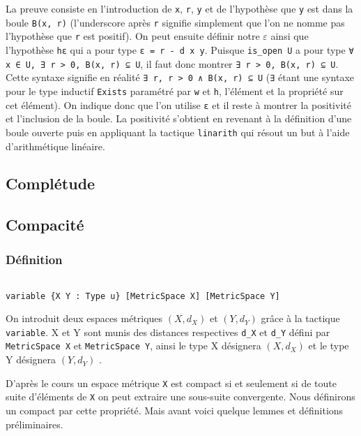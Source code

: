 \documentclass[a4paper, 12pt]{article}
\newcommand{\lean}[1]{\texttt{#1}}
\begin{document}
La preuve consiste en l'introduction de \lean{x}, \lean{r}, \lean{y} et de l'hypothèse que \lean{y} est dans la boule \lean{B(x, r)} (l'underscore après \lean{r} signifie simplement que l'on ne nomme pas l'hypothèse que \lean{r} est positif). On peut ensuite définir notre $ε$ ainsi que l'hypothèse \lean{hε} qui a pour type \lean{ε = r - d x y}. Puisque \lean{is_open U} a pour type \lean{∀ x ∈ U, ∃ r > 0, B(x, r) ⊆ U}, il faut donc montrer \lean{∃ r > 0, B(x, r) ⊆ U}. Cette syntaxe signifie en réalité \lean{∃ r, r > 0 ∧ B(x, r) ⊆ U} (\lean{∃} étant une syntaxe pour le type inductif \lean{Exists} paramétré par \lean{w} et \lean{h}, l'élément et la propriété sur cet élément). On indique donc que l'on utilise \lean{ε} et il reste à montrer la positivité et l'inclusion de la boule. La positivité s'obtient en revenant à la définition d'une boule ouverte puis en appliquant la tactique \lean{linarith} qui résout un but à l'aide d'arithmétique linéaire.

\subsection{Complétude}


\subsection{Compacité}

\subsubsection{Définition}

\begin{verbatim}

variable {X Y : Type u} [MetricSpace X] [MetricSpace Y]

\end{verbatim}

On introduit deux espaces métriques $(X,d_{X})$ et  $(Y,d_{Y})$ grâce à la tactique \lean{variable}. X et Y sont munis des distances respectives \lean{d_{X}} et \lean{d_{Y}} défini par \lean{MetricSpace X} et \lean{MetricSpace Y}, ainsi le type X désignera  $(X,d_{X})$ et le type Y désignera $(Y,d_{Y})$ .

D'après le cours un espace métrique \lean{X} est compact si et seulement si de toute suite d'éléments de \lean{X} on peut extraire une sous-suite convergente. Nous définirons un compact par cette propriété. Mais avant voici quelque lemmes et définitions préliminaires. 
\end{document}
